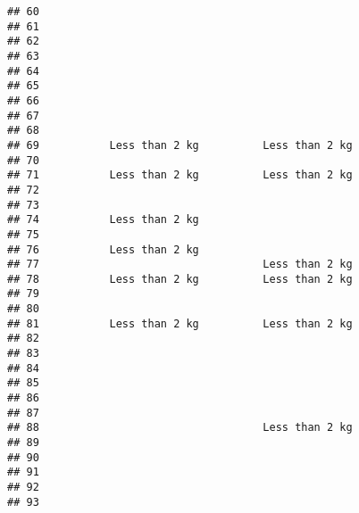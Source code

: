 \documentclass[
]{article}
\begin{document}
\begin{verbatim}
## 60                                                                        
## 61                                                                        
## 62                                                                        
## 63                                                                        
## 64                                                                        
## 65                                                                        
## 66                                                                        
## 67                                                                        
## 68                                                                        
## 69           Less than 2 kg          Less than 2 kg                       
## 70                                                                        
## 71           Less than 2 kg          Less than 2 kg                       
## 72                                                                        
## 73                                                                        
## 74           Less than 2 kg                                               
## 75                                                                        
## 76           Less than 2 kg                                               
## 77                                   Less than 2 kg                       
## 78           Less than 2 kg          Less than 2 kg                       
## 79                                                                        
## 80                                                                        
## 81           Less than 2 kg          Less than 2 kg                       
## 82                                                                        
## 83                                                                        
## 84                                                                        
## 85                                                                        
## 86                                                                        
## 87                                                                        
## 88                                   Less than 2 kg                       
## 89                                                                        
## 90                                                                        
## 91                                                                        
## 92                                                                        
## 93                                                                        

\end{verbatim}
\end{document}
